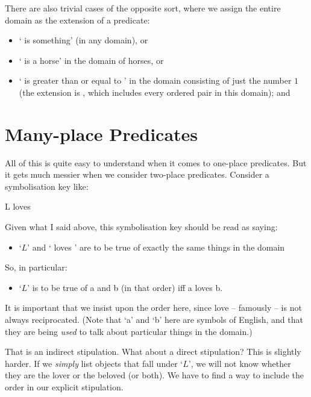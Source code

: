 There are also trivial cases of the opposite sort, where we assign the entire domain as the extension of a predicate: \begin{itemize}
	\item ` is something' (in any domain), or
	\item ` is a horse' in the domain of horses, or 
	\item ` is greater than or equal to ' in the domain consisting of just the number $1$ (the extension is , which includes every ordered pair in this domain); and
\end{itemize}





\section{Many-place Predicates}
All of this is quite easy to understand when it comes to one-place predicates. But it gets much messier when we consider two-place predicates. Consider a symbolisation key like:
	\begin{ekey}
		\item[L]  loves 
	\end{ekey}
Given what I said above, this symbolisation key should be read as saying:
	\begin{itemize}
		\item `$L$' and ` loves ' are to be true of exactly the same things in the domain
	\end{itemize}
So, in particular:
	\begin{itemize}
		\item `$L$' is to be true of a and b (in that order) iff a loves b. 
	\end{itemize}
It is important that we insist upon the order here, since love – famously – is not always reciprocated. (Note that `a' and `b' here are symbols of English, and that they are being \emph{used} to talk about particular things in the domain.)

That is an indirect stipulation. What about a direct stipulation? This is slightly harder. If we \emph{simply} list objects that fall under `$L$', we will not know whether they are the lover or the beloved (or both). We have to find a way to include the order in our explicit stipulation. 


